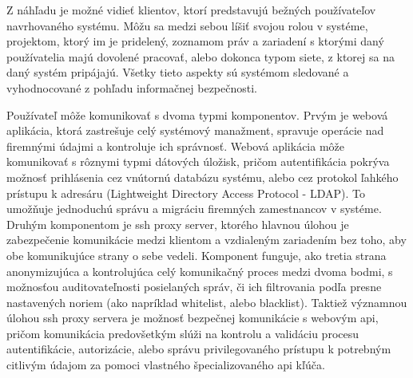 Z náhľadu je možné vidieť klientov, ktorí predstavujú bežných používateľov navrhovaného systému.
Môžu sa medzi sebou líšiť svojou rolou v systéme, projektom, ktorý im je pridelený, zoznamom práv a zariadení s ktorými
daný používatelia majú dovolené pracovať, alebo dokonca typom siete, z ktorej sa na daný systém pripájajú.
Všetky tieto aspekty sú systémom sledované a vyhodnocované z pohľadu informačnej bezpečnosti.

Používateľ môže komunikovať s dvoma typmi komponentov.
Prvým je webová aplikácia, ktorá zastrešuje celý systémový manažment, spravuje operácie nad firemnými údajmi a kontroluje
ich správnosť.
Webová aplikácia môže komunikovať s rôznymi typmi dátových úložisk, pričom autentifikácia pokrýva možnosť prihlásenia cez
vnútornú databázu systému, alebo cez protokol ľahkého prístupu k adresáru (Lightweight Directory Access Protocol - LDAP).
To umožňuje jednoduchú správu a migráciu firemných zamestnancov v systéme.
Druhým komponentom je ssh proxy server, ktorého hlavnou úlohou je zabezpečenie komunikácie medzi klientom a vzdialeným
zariadením bez toho, aby obe komunikujúce strany o sebe vedeli.
Komponent funguje, ako tretia strana anonymizujúca a kontrolujúca celý komunikačný proces medzi dvoma bodmi, s možnosťou
auditovateľnosti posielaných správ, či ich filtrovania podľa presne nastavených noriem (ako napríklad whitelist, alebo blacklist).
Taktiež významnou úlohou ssh proxy servera je možnosť bezpečnej komunikácie s webovým api, pričom komunikácia predovšetkým
slúži na kontrolu a validáciu procesu autentifikácie, autorizácie, alebo správu privilegovaného prístupu k potrebným citlivým
údajom za pomoci vlastného špecializovaného api kľúča.

